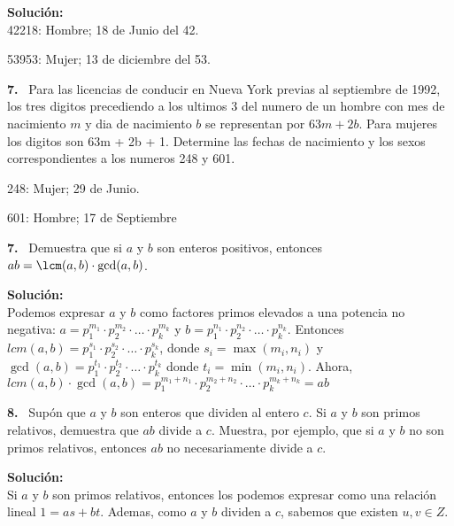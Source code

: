 \documentclass{article}
\newcounter{problem}
\newcounter{solution}
\newcommand\Problem[1]{%
  \stepcounter{problem}%
  \textbf{#1.}~%
  \setcounter{solution}{0}%
}
\newcommand\TheSolution{%
  \textbf{Solución:}\\%
}
\begin{document}
\TheSolution{}
42218: Hombre; 18 de Junio del 42.

53953: Mujer; 13 de diciembre del 53.

\Problem{7} Para las licencias de conducir en Nueva York previas al septiembre
de 1992, los tres digitos precediendo a los ultimos 3 del numero de un hombre
con mes de nacimiento $m$ y dia de nacimiento $b$ se representan por $63m +
2b$. Para mujeres los digitos son 63m + 2b + 1. Determine las fechas de
nacimiento y los sexos correspondientes a los numeros 248 y 601.

248: Mujer; 29 de Junio.

601: Hombre; 17 de Septiembre

\Problem{7} Demuestra que si $a$ y $b$ son enteros positivos, entonces $ab =
\lcm(a, b)\cdot\gcd(a, b)$.

\TheSolution{} Podemos expresar $a$ y $b$ como factores primos elevados a una
potencia no negativa: $a = p_1^{m_1}\cdot p_2^{m_2}\cdot \ldots\cdot
p_k^{m_k}$ y $b = p_1^{n_1}\cdot p_2^{n_2}\cdot \ldots\cdot p_k^{n_k}$.
Entonces $lcm(a, b) = p_1^{s_1}\cdot p_2^{s_2}\cdot \ldots\cdot p_k^{s_k}$,
donde $s_i = \max(m_i, n_i)$ y $\gcd(a, b) = p_1^{t_1}\cdot p_2^{t_2}\cdot
\ldots\cdot p_k^{t_k}$ donde $t_i = \min(m_i, n_i)$. Ahora, $lcm(a, b)
\cdot \gcd(a, b) = p_1^{m_1 + n_1}\cdot p_2^{m_2 + n_2}\cdot \ldots\cdot
p_k^{m_k + n_k} = ab$

\Problem{8} Supón que $a$ y $b$ son enteros que dividen al entero $c$. Si $a$
y $b$ son primos relativos, demuestra que $ab$ divide a $c$. Muestra, por
ejemplo, que si $a$ y $b$ no son primos relativos, entonces $ab$ no
necesariamente divide a $c$.

\TheSolution{}
Si $a$ y $b$ son primos relativos, entonces los podemos expresar como una
relación lineal $1 = as + bt$. Ademas, como $a$ y $b$ dividen a $c$, sabemos
que existen $u, v \in Z$.
\end{document}
